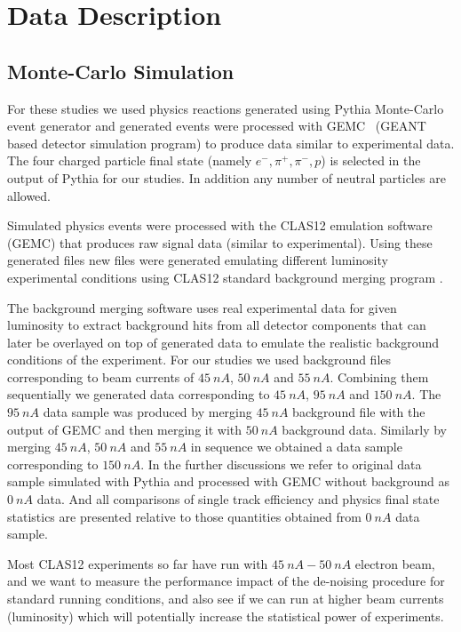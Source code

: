 \section{Data Description}

\subsection{Monte-Carlo Simulation}

For these studies we used physics reactions generated using Pythia Monte-Carlo~\cite{Pythia:2022} event generator and generated events were processed with GEMC~\cite{gemc:2022} (GEANT~\cite{geant4:2022} based detector simulation program) to produce data similar to experimental data. The four charged particle final state (namely $e^-,\pi^+,\pi^-,p$) is selected in the output of Pythia for our studies.
In addition any number of neutral particles are allowed.

Simulated physics events were processed with the CLAS12 emulation software (GEMC) that produces raw signal data (similar to experimental).
Using these generated files new files were generated emulating different luminosity experimental conditions using CLAS12 standard background merging program \cite{Stepanyan:2020bg}. 

The background merging software uses real experimental data for given luminosity to extract background hits from all detector components that can later be overlayed on top of generated data to emulate the realistic background conditions of the experiment. For our studies we used background files corresponding to beam currents of $45~nA$, $50~nA$ and $55~nA$. Combining them sequentially we generated data corresponding to $45~nA$, $95~nA$ and $150~nA$. The $95~nA$ data sample was produced by merging $45~nA$ background file with the output of GEMC and then merging it with $50~nA$ background data. Similarly by merging $45~nA$, $50~nA$ and $55~nA$ in sequence we obtained a data sample corresponding to $150~nA$. In the further discussions we refer to original data sample simulated with Pythia and processed with GEMC without background as $0~nA$ data. And all comparisons of single track efficiency and physics final state statistics 
are presented relative to those quantities obtained from $0~nA$ data sample.

Most CLAS12 experiments so far have run with $45~nA-50~nA$ electron beam, and we want to measure the performance impact of the de-noising procedure for standard running conditions, and also see if we can run at higher beam currents (luminosity) which will potentially increase the statistical power of experiments.

